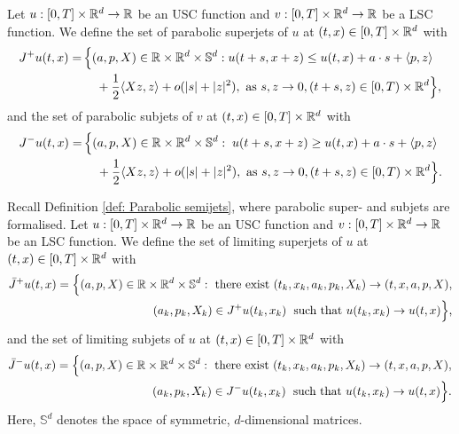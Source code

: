 \begin{definition}
\label{def: Parabolic semijets}
    Let $u: [0,T] \times \mathbb{R}^d \rightarrow \mathbb{R}$ be an USC function and $v:[0,T] \times \mathbb{R}^d \rightarrow \mathbb{R}$ be a LSC function. We define the set of parabolic superjets of $u$ at $(t,x)\in [0,T]\times \mathbb{R}^d$ with
    \begin{align*}
        J^+ u(t,x) = \, & \Big\{(a,p,X) \in \mathbb{R} \times \mathbb{R}^d \times \mathbb S^d: u(t+s,x+z) 
        \leq u(t,x) + a\cdot s + \langle p,z \rangle \\
        & \quad + \frac 1 2 \langle Xz, z \rangle + o(|s| + |z|^2), \text{ as } s,z \rightarrow 0, (t+s,z) \in [0,T) \times \mathbb{R}^d \Big\},
    \end{align*}
    and the set of parabolic subjets of $v$ at $(t,x)\in [0,T]\times \mathbb{R}^d$ with
    \begin{align*}
         J^- u(t,x) = \, & \Big\{ (a,p,X) \in \mathbb{R} \times \mathbb{R}^d \times \mathbb S^d: \; u(t+s,x+z) \geq u(t,x) + a\cdot s + \langle p,z \rangle \\
         & \quad + \frac 1 2 \langle Xz, z \rangle + o(|s| + |z|^2), \text{ as } s,z \rightarrow 0, (t+s,z) \in [0,T) \times \mathbb{R}^d \Big\}.
    \end{align*}
\end{definition}

\begin{definition}
\label{def: Limiting parabolic semijets}
    Recall Definition \ref{def: Parabolic semijets}, where parabolic super- and subjets are formalised. Let $u: [0,T] \times \mathbb{R}^d \rightarrow \mathbb{R}$ be an USC function and $v:[0,T] \times \mathbb{R}^d \rightarrow \mathbb{R}$ be an LSC function. We define the set of limiting superjets of $u$ at $(t,x) \in [0,T] \times \mathbb{R}^d$ with
    \begin{align*}
        \bar J^+ u(t,x) = \Big\{ (a,p,X) \in \mathbb{R} \times \mathbb{R}^d \times \mathbb S^d: \text{ there exist } (t_k,x_k,a_k,p_k,X_k) \rightarrow (t,x,a,p,X), \\
        (a_k,p_k,X_k) \in J^+ u(t_k,x_k)  \; \text{ such that } u(t_k,x_k) \rightarrow u(t,x) \Big\},
    \end{align*}
    and the set of limiting subjets of $u$ at $(t,x) \in [0,T] \times \mathbb{R}^d$ with
    \begin{equation*}
    \begin{aligned}
        \bar J^- u(t,x) = \Big\{ (a,p,X) \in \mathbb{R} \times \mathbb{R}^d \times \mathbb S^d: \text{ there exist } (t_k,x_k,a_k,p_k,X_k) \rightarrow (t,x,a,p,X), \\
        (a_k,p_k,X_k) \in J^- u(t_k,x_k)  \; \text{ such that } u(t_k,x_k) \rightarrow u(t,x) \Big\}.
    \end{aligned}
    \end{equation*}
    Here, $\mathbb S^d$ denotes the space of symmetric, $d$-dimensional matrices.
\end{definition}

